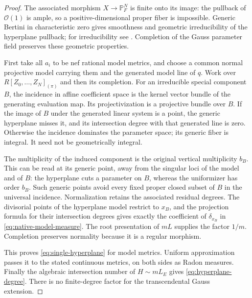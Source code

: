 \documentclass[11pt,reqno]{amsart}
\theoremstyle{definition}
\theoremstyle{remark}
\numberwithin{equation}{section}
\begin{document}
\begin{proof}
The associated morphism \(X\to\mathbb P_F^N\) is finite onto its
image: the pullback of \(\mathcal O(1)\) is ample, so a
positive-dimensional proper fiber is impossible. Generic Bertini
in characteristic zero gives smoothness and geometric
irreducibility of the hyperplane pullback; for irreducibility see
\cite[Lemma~37.32.3]{Stacks}. Completion of the Gauss parameter
field preserves these geometric properties.

First take all \(a_i\) to be nef rational model metrics,
and choose a common normal projective model carrying them and the
generated model line of \(q\). Work over
\(R[Z_0,\ldots,Z_N]_{(\pi)}\) and then its completion. For an
irreducible special component \(B\), the incidence in affine
coefficient space is the kernel vector bundle of the generating
evaluation map. Its projectivization is a projective bundle over
\(B\). If the image of \(B\) under the
generated linear system is a point, the generic hyperplane misses
it, and its intersection degree with that generated line is zero.
Otherwise the incidence dominates the parameter space; its generic
fiber is integral. It need not be geometrically integral.

The multiplicity of the induced component is the original
vertical multiplicity \(b_B\). This can be read at its generic
point, away from the singular loci of the model and of \(B\):
the hyperplane cuts a parameter on \(B\), whereas the uniformizer
has order \(b_B\). Such generic points avoid every fixed proper
closed subset of \(B\) in the universal incidence. Normalization
retains the associated residual degrees. The divisorial points of
the hyperplane model restrict to \(x_B\), and the projection formula
for their intersection degrees gives exactly the coefficient of
\(\delta_{x_B}\) in \eqref{eq:native-model-measure}. The root
presentation of \(mL\) supplies the factor \(1/m\).
Completion preserves normality because it is a regular morphism.

This proves \eqref{eq:single-hyperplane} for model metrics.
Uniform approximation passes it to the stated continuous
metrics, on both sides as Radon measures. Finally the algebraic
intersection number of \(H\sim mL_E\) gives
\eqref{eq:hyperplane-degree}. There is no finite-degree factor for
the transcendental Gauss extension.
\end{proof}
\end{document}

